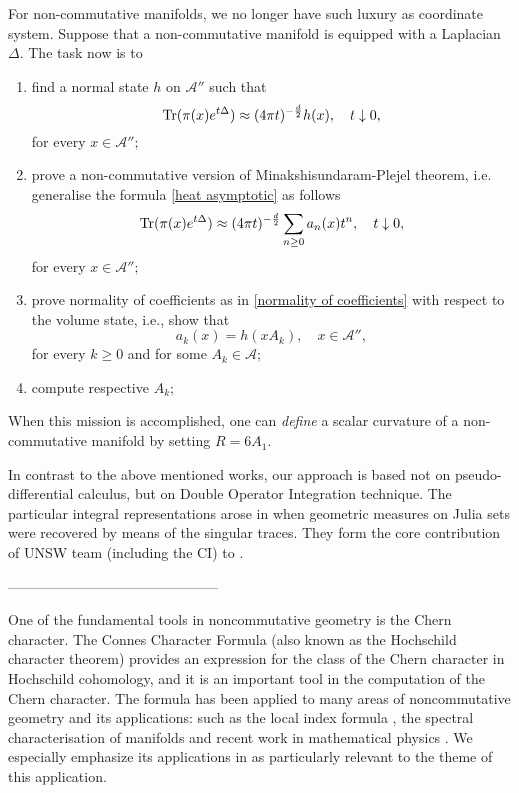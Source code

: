 \documentclass{article}
\begin{document}
For non-commutative manifolds, we no longer have such luxury as coordinate system. Suppose that a non-commutative manifold is equipped with a Laplacian $\Delta.$ The task now is to
\begin{enumerate}
\item\label{raph1} find a normal state $h$ on $\mathcal{A}''$ such that
\begin{equation}\label{raph1 eq}
{\rm Tr}(\pi(x)e^{t\Delta})\approx (4\pi t)^{-\frac{d}{2}} h(x),\quad t\downarrow0,
\end{equation}
for every $x\in\mathcal{A}'';$
\item\label{raph2} prove a non-commutative version of Minakshisundaram-Plejel theorem, i.e. generalise the formula \eqref{heat asymptotic} as follows
$${\rm Tr}(\pi(x)e^{t\Delta})\approx (4\pi t)^{-\frac{d}{2}} \sum_{n\geq0}a_n(x)t^n,\quad t\downarrow0,$$
for every $x\in\mathcal{A}'';$
\item\label{raph3} prove normality of coefficients as in \eqref{normality of coefficients} with respect to the volume state, i.e., show that
$$a_k(x)=h(xA_k),\quad x\in\mathcal{A}'',$$
for every $k\geq0$ and for some $A_k\in\mathcal{A};$ 
\item\label{raph4} compute respective $A_k;$
\end{enumerate}
When this mission is accomplished, one can {\it define} a scalar curvature of a non-commutative manifold by setting $R=6A_1.$

In contrast to the above mentioned works, our approach is based not on pseudo-differential calculus, but on Double Operator Integration technique. The particular integral representations  arose in \cite{Connes_team} when geometric measures on Julia sets were recovered by means of the singular traces. They form the core contribution of UNSW team (including the CI) to \cite{Connes_team}.



---------------------------------------------


One of the fundamental tools in noncommutative geometry is the Chern character. The Connes Character Formula (also known as the Hochschild character theorem) provides an expression for the class of the Chern character in Hochschild cohomology, and it is an important    tool in the computation of the Chern character. The formula has been applied to many areas     of noncommutative geometry and its applications: such as the local index formula \cite{ConnesMoscovici}, the spectral characterisation of manifolds \cite{Connes-reconstruction} and recent work in mathematical physics \cite{Connes-Chamseddine-Mukhanov-quanta-of-geometry-2015}. We especially emphasize its applications in \cite{Connes-reconstruction} as particularly relevant to the theme of this application.
\end{document}
